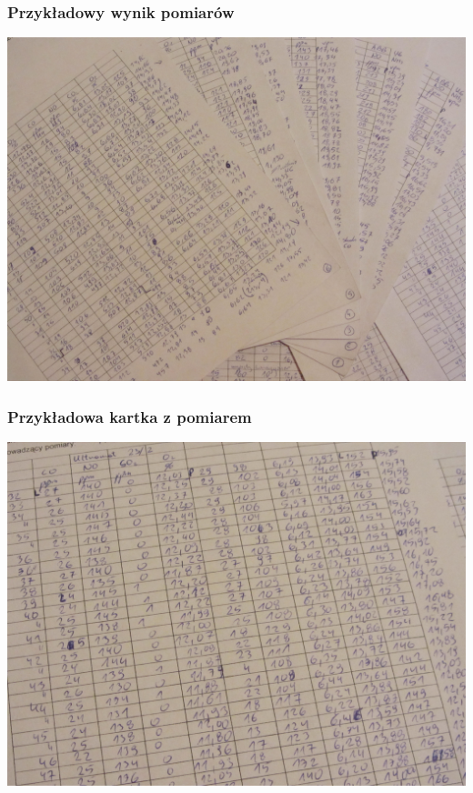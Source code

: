 \documentclass[ucs]{beamer}
\begin{document}
\begin{frame}
\frametitle{Przykładowy wynik pomiarów}
\begin{center}
\includegraphics[width=0.99\textheight]{images/IMG_4559}
\end{center}
\end{frame}

\begin{frame}
\frametitle{Przykładowa kartka z pomiarem}
\begin{center}
\includegraphics[width=0.99\textheight]{images/IMG_4562}
\end{center}
\end{frame}
\end{document}
